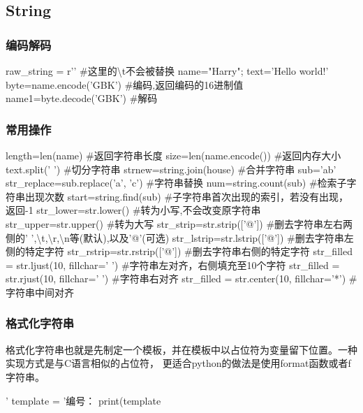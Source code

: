 \documentclass{article}
\begin{document}
    \subsection{String}
      \subsubsection{编码解码}
        \begin{codeblock}[language=python, caption={create a string}]
          raw_string = r'\tTab' #这里的\textbackslash t不会被替换
          name="Harry"; text='Hello world!'
          byte=name.encode('GBK') #编码,返回编码的16进制值
          name1=byte.decode('GBK') #解码
        \end{codeblock}

      \subsubsection{常用操作}
        \begin{codeblock}[language=python, caption={basic operations of string}]
          length=len(name) #返回字符串长度
          size=len(name.encode()) #返回内存大小
          text.split(' ') #切分字符串
          strnew=string.join(house) #合并字符串
          sub='ab'
          str_replace=sub.replace('a', 'c') #字符串替换
          num=string.count(sub) #检索子字符串出现次数
          start=string.find(sub) #子字符串首次出现的索引，若没有出现，返回-1
          str_lower=str.lower() #转为小写,不会改变原字符串
          str_upper=str.upper() #转为大写
          str_strip=str.strip(['@']) #删去字符串左右两侧的' ',\textbackslash t,\textbackslash r,\textbackslash n等(默认),以及'@'(可选)
          str_lstrip=str.lstrip(['@']) #删去字符串左侧的特定字符
          str_rstrip=str.rstrip(['@']) #删去字符串右侧的特定字符
          str_filled = str.ljust(10, fillchar=' ') #字符串左对齐，右侧填充至10个字符
          str_filled = str.rjust(10, fillchar=' ') #字符串右对齐
          str_filled = str.center(10, fillchar='*') #字符串中间对齐
        \end{codeblock}

      \subsubsection{格式化字符串}
        格式化字符串也就是先制定一个模板，并在模板中以占位符为变量留下位置。一种实现方式是与C语言相似的占位符，
        更适合python的做法是使用format函数或者f字符串。
        \begin{codeblock}[language=python, caption={formatting string1}]
          '%
          template = '编号：%
          print(template%
        \end{codeblock}
\end{document}
